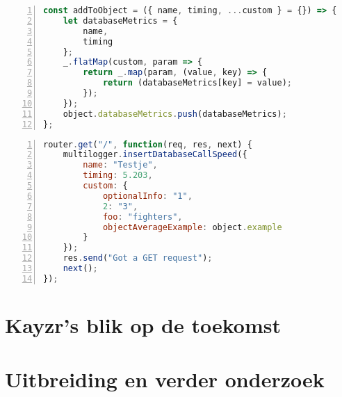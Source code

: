 \begin{lstlisting}[language=JavaScript, breaklines=true, numbers=left, frame=single, caption={Extra informatie wordt doorgestuurd naar InfluxDB},label=code:addToObject]
const addToObject = ({ name, timing, ...custom } = {}) => {
	let databaseMetrics = {
		name,
		timing
	};
	_.flatMap(custom, param => {
		return _.map(param, (value, key) => {
			return (databaseMetrics[key] = value);
		});
	});
	object.databaseMetrics.push(databaseMetrics);
};
\end{lstlisting}
\begin{lstlisting}[language=JavaScript, breaklines=true, numbers=left, frame=single, caption={Deze functie kan overal in de API worden opgeroepen},label=code:plugin]
router.get("/", function(req, res, next) {
	multilogger.insertDatabaseCallSpeed({
		name: "Testje",
		timing: 5.203,
		custom: {
			optionalInfo: "1",
			2: "3",
			foo: "fighters",
			objectAverageExample: object.example
		}
	});
	res.send("Got a GET request");
	next();
});
\end{lstlisting}


\section{Kayzr's blik op de toekomst}
\label{sec:future}


\section{Uitbreiding en verder onderzoek}
\label{sec:expansin}


